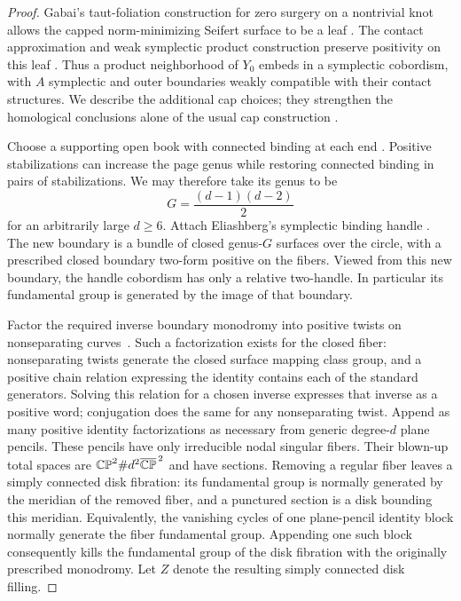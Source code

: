\begin{proof}
Gabai's taut-foliation construction for zero surgery on a nontrivial knot
allows the capped norm-minimizing Seifert surface to be a leaf
\cite[Corollary~8.10 and Remark~8.13]{Gabai1987}.
The contact approximation and weak symplectic product
construction preserve positivity on this leaf
\cite{EliashbergThurston1998}.  Thus a product neighborhood of $Y_0$
embeds in a symplectic cobordism, with $A$ symplectic and outer boundaries
weakly compatible with their contact structures.  We describe the additional
cap choices; they strengthen
the homological conclusions alone of the usual cap construction
\cite[Theorem~8 and Lemmas~9--12]{KronheimerMrowka2004}.

Choose a supporting open book with connected binding at each end
\cite[Theorems~3--4]{Giroux2002}.
Positive stabilizations can increase the page genus while restoring
connected binding in pairs of stabilizations.  We may therefore take its
genus to be
\[
                     G=\frac{(d-1)(d-2)}2
\]
for an arbitrarily large $d\ge6$.  Attach Eliashberg's symplectic binding
handle \cite[Theorem~1.1]{Eliashberg2004}.  The new boundary is a bundle of
closed genus-$G$ surfaces over the circle, with a prescribed closed
boundary two-form positive on the fibers.  Viewed from this new boundary,
the handle cobordism has only a relative two-handle.  In particular its
fundamental group is generated by the image of that boundary.

Factor the required inverse boundary monodromy into positive twists on
nonseparating curves~\cite[Lemma~2, arXiv version~2]{AkbulutOzbagci2002}.
Such a factorization exists for the closed fiber: nonseparating twists
generate the closed surface mapping class group, and a positive chain
relation expressing the identity contains each of the standard generators.
Solving this relation for a chosen inverse expresses that inverse as a
positive word; conjugation does the same for any nonseparating twist.
Append as many positive identity factorizations as necessary from generic
degree-$d$ plane pencils.  These pencils have only irreducible nodal
singular fibers.  Their blown-up total spaces are
$\mathbb{CP}^2\#d^2\overline{\mathbb{CP}}^{\,2}$ and have sections.  Removing a regular
fiber leaves a simply connected disk fibration: its fundamental group is
normally generated by the meridian of the removed fiber, and a punctured
section is a disk bounding this meridian.  Equivalently, the vanishing
cycles of one plane-pencil identity block normally generate the fiber
fundamental group.  Appending one such block consequently kills the
fundamental group of the disk fibration with the originally prescribed
monodromy.  Let $Z$ denote the resulting simply connected disk filling.


\end{proof}
